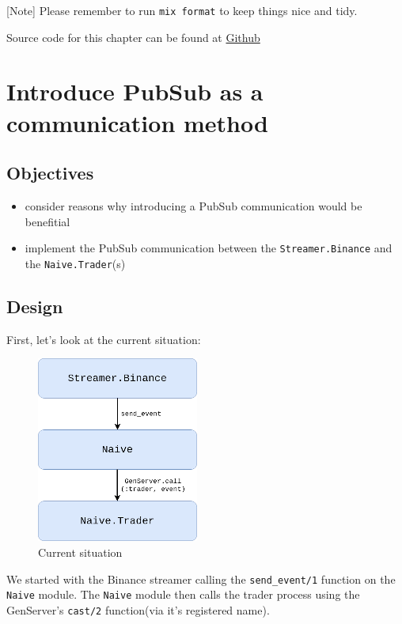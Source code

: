 \documentclass[
]{book}
\providecommand{\tightlist}{%
  \setlength{\itemsep}{0pt}\setlength{\parskip}{0pt}}
\begin{document}
{[}Note{]} Please remember to run \texttt{mix\ format} to keep things nice and tidy.

Source code for this chapter can be found at \href{https://github.com/frathon/create-a-cryptocurrency-trading-bot-in-elixir-source-code/tree/chapter_02}{Github}

\hypertarget{introduce-pubsub-as-a-communication-method}{%
\chapter{Introduce PubSub as a communication method}\label{introduce-pubsub-as-a-communication-method}}

\hypertarget{objectives-2}{%
\section{Objectives}\label{objectives-2}}

\begin{itemize}
\tightlist
\item
  consider reasons why introducing a PubSub communication would be benefitial
\item
  implement the PubSub communication between the \texttt{Streamer.Binance} and the \texttt{Naive.Trader}(s)
\end{itemize}

\hypertarget{design}{%
\section{Design}\label{design}}

First, let's look at the current situation:

\begin{figure}
\centering
\includegraphics{images/chapter_03_01_current_situation.png}
\caption{Current situation}
\end{figure}

We started with the Binance streamer calling the \texttt{send\_event/1} function on the \texttt{Naive} module. The \texttt{Naive} module then calls the trader process using the GenServer's \texttt{cast/2} function(via it's registered name).
\end{document}
